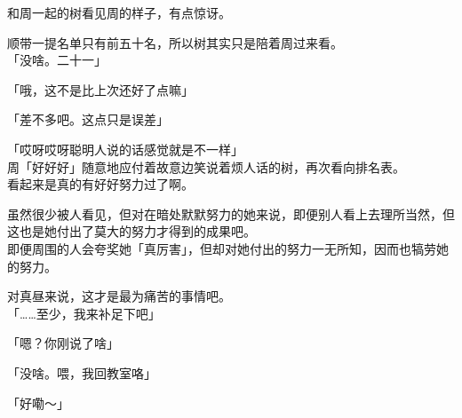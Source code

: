 和周一起的树看见周的样子，有点惊讶。

顺带一提名单只有前五十名，所以树其实只是陪着周过来看。\\

「没啥。二十一」

「哦，这不是比上次还好了点嘛」

「差不多吧。这点只是误差」

「哎呀哎呀聪明人说的话感觉就是不一样」\\

周「好好好」随意地应付着故意边笑说着烦人话的树，再次看向排名表。\\

看起来是真的有好好努力过了啊。

虽然很少被人看见，但对在暗处默默努力的她来说，即便别人看上去理所当然，但这也是她付出了莫大的努力才得到的成果吧。\\

即便周围的人会夸奖她「真厉害」，但却对她付出的努力一无所知，因而也犒劳她的努力。

对真昼来说，这才是最为痛苦的事情吧。\\

「……至少，我来补足下吧」

「嗯？你刚说了啥」

「没啥。喂，我回教室咯」

「好嘞～」\\

\vspace{2\baselineskip}

